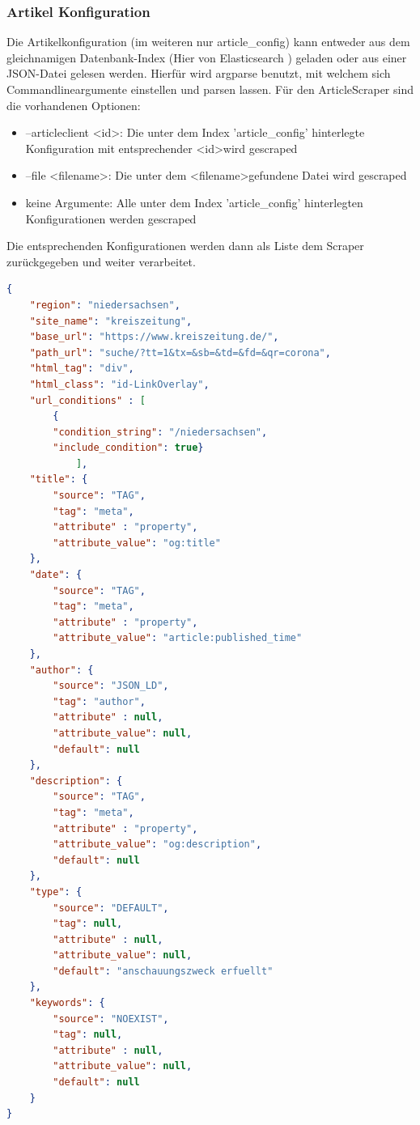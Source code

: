 \documentclass[12pt,oneside,a4paper,parskip]{scrbook}
\begin{document}
\subsubsection{Artikel Konfiguration}
Die Artikelkonfiguration (im weiteren nur article\_config) kann entweder aus dem gleichnamigen Datenbank-Index (Hier von  Elasticsearch ) geladen oder aus einer JSON-Datei gelesen werden. Hierfür wird argparse benutzt, mit welchem sich Commandlineargumente einstellen und parsen lassen. Für den ArticleScraper sind die vorhandenen Optionen:
\begin{itemize}
\item --articleclient \textless id\textgreater: Die unter dem Index 'article\_config' hinterlegte Konfiguration mit entsprechender \textless id\textgreater wird gescraped
\item --file \textless filename\textgreater: Die unter dem \textless filename\textgreater gefundene Datei wird gescraped
\item keine Argumente: Alle unter dem Index 'article\_config' hinterlegten Konfigurationen werden gescraped
\end{itemize}
Die entsprechenden Konfigurationen werden dann als Liste dem Scraper zurückgegeben und weiter verarbeitet.
\begin{lstlisting}[caption=article\_config am Beispiel Niedersachsen,label=articleconfig,language=json]
{
    "region": "niedersachsen",
    "site_name": "kreiszeitung",
    "base_url": "https://www.kreiszeitung.de/",
    "path_url": "suche/?tt=1&tx=&sb=&td=&fd=&qr=corona",
    "html_tag": "div",
    "html_class": "id-LinkOverlay",
    "url_conditions" : [
        {
        "condition_string": "/niedersachsen",
        "include_condition": true}
        	],
    "title": {
        "source": "TAG",
        "tag": "meta",
        "attribute" : "property",
        "attribute_value": "og:title"
    },
    "date": {
        "source": "TAG",
        "tag": "meta",
        "attribute" : "property",
        "attribute_value": "article:published_time"
    },
    "author": {
        "source": "JSON_LD",
        "tag": "author",
        "attribute" : null,
        "attribute_value": null,
        "default": null
    },
    "description": {
        "source": "TAG",
        "tag": "meta",
        "attribute" : "property",
        "attribute_value": "og:description",
        "default": null
    },
    "type": {
        "source": "DEFAULT",
        "tag": null,
        "attribute" : null,
        "attribute_value": null,
        "default": "anschauungszweck erfuellt"
    },
    "keywords": {
        "source": "NOEXIST",
        "tag": null,
        "attribute" : null,
        "attribute_value": null,
        "default": null
    }
}
\end{lstlisting}
\pagebreak
\end{document}
